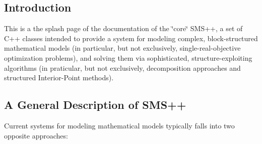  \subsection*{Introduction }

This is a the splash page of the documentation of the \char`\"{}core\char`\"{} S\+M\+S++, a set of C++ classes intended to provide a system for modeling complex, block-\/structured mathematical models (in particular, but not exclusively, single-\/real-\/objective optimization problems), and solving them via sophisticated, structure-\/exploiting algorithms (in praticular, but not exclusively, decomposition approaches and structured Interior-\/\+Point methods).

\subsection*{A General Description of S\+M\+S++ }

Current systems for modeling mathematical models typically falls into two opposite approaches\+:


